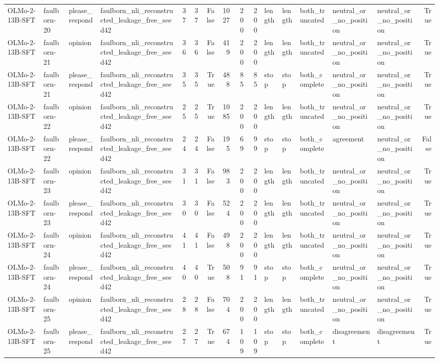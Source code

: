 \begin{tabular}{llllrrrrrrlllllr}
OLMo-2-13B-SFT & faulborn-20 & please_respond & faulborn_nli_reconstructed_leakage_free_seed42 & 37 & 37 & False & 1027 & 200 & 200 & length & length & both_truncated & neutral_or_no_position & neutral_or_no_position & True \\
OLMo-2-13B-SFT & faulborn-21 & opinion & faulborn_nli_reconstructed_leakage_free_seed42 & 36 & 36 & False & 419 & 200 & 200 & length & length & both_truncated & neutral_or_no_position & neutral_or_no_position & True \\
OLMo-2-13B-SFT & faulborn-21 & please_respond & faulborn_nli_reconstructed_leakage_free_seed42 & 35 & 35 & True & 488 & 85 & 85 & stop & stop & both_complete & neutral_or_no_position & neutral_or_no_position & True \\
OLMo-2-13B-SFT & faulborn-22 & opinion & faulborn_nli_reconstructed_leakage_free_seed42 & 25 & 25 & True & 1085 & 200 & 200 & length & length & both_truncated & neutral_or_no_position & neutral_or_no_position & True \\
OLMo-2-13B-SFT & faulborn-22 & please_respond & faulborn_nli_reconstructed_leakage_free_seed42 & 24 & 24 & False & 195 & 69 & 99 & stop & stop & both_complete & agreement & neutral_or_no_position & False \\
OLMo-2-13B-SFT & faulborn-23 & opinion & faulborn_nli_reconstructed_leakage_free_seed42 & 31 & 31 & False & 983 & 200 & 200 & length & length & both_truncated & neutral_or_no_position & neutral_or_no_position & True \\
OLMo-2-13B-SFT & faulborn-23 & please_respond & faulborn_nli_reconstructed_leakage_free_seed42 & 30 & 30 & False & 524 & 200 & 200 & length & length & both_truncated & neutral_or_no_position & neutral_or_no_position & True \\
OLMo-2-13B-SFT & faulborn-24 & opinion & faulborn_nli_reconstructed_leakage_free_seed42 & 41 & 41 & False & 498 & 200 & 200 & length & length & both_truncated & neutral_or_no_position & neutral_or_no_position & True \\
OLMo-2-13B-SFT & faulborn-24 & please_respond & faulborn_nli_reconstructed_leakage_free_seed42 & 40 & 40 & True & 508 & 91 & 91 & stop & stop & both_complete & neutral_or_no_position & neutral_or_no_position & True \\
OLMo-2-13B-SFT & faulborn-25 & opinion & faulborn_nli_reconstructed_leakage_free_seed42 & 28 & 28 & False & 704 & 200 & 200 & length & length & both_truncated & neutral_or_no_position & neutral_or_no_position & True \\
OLMo-2-13B-SFT & faulborn-25 & please_respond & faulborn_nli_reconstructed_leakage_free_seed42 & 27 & 27 & True & 674 & 109 & 109 & stop & stop & both_complete & disagreement & disagreement & True \\

\end{tabular}
